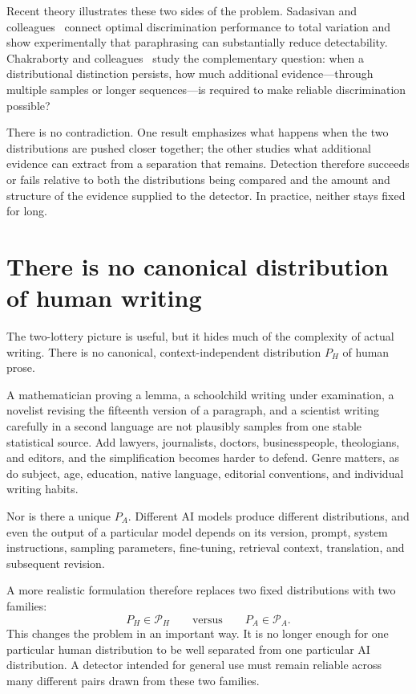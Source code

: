 \documentclass[pdflatex,sn-mathphys-num]{sn-jnl}
\begin{document}
Recent theory illustrates these two sides of the problem. Sadasivan and colleagues~\cite{Sadasivan2025} connect optimal discrimination performance 
to total variation and show experimentally that paraphrasing can substantially reduce detectability. Chakraborty and colleagues~\cite{Chakraborty2024} 
study the complementary question: when a distributional distinction persists, how much additional evidence---through multiple samples or longer 
sequences---is required to make reliable discrimination possible?

There is no contradiction. One result emphasizes what happens when the two distributions are pushed closer together; the other studies what additional 
evidence can extract from a separation that remains. Detection therefore succeeds or fails relative to both the distributions being compared and the amount 
and structure of the evidence supplied to the detector. In practice, neither stays fixed for long.

\section*{There is no canonical distribution of human writing}
The two-lottery picture is useful, but it hides much of the complexity of actual writing. There is no canonical, context-independent distribution \(P_H\)
of human prose.

A mathematician proving a lemma, a schoolchild writing under examination, a novelist revising the fifteenth version of a paragraph, and a scientist 
writing carefully in a second language are not plausibly samples from one stable statistical source. Add lawyers, journalists, doctors, businesspeople, 
theologians, and editors, and the simplification becomes harder to defend. Genre matters, as do subject, age, education, native 
language, editorial conventions, and individual writing habits.

Nor is there a unique \(P_A\). Different AI models produce different distributions, and even the output of a particular model depends on its version, 
prompt, system instructions, sampling parameters, fine-tuning, retrieval context, translation, and subsequent revision.

A more realistic formulation therefore replaces two fixed distributions with two families:
\[
P_H\in\mathcal P_H
\qquad\text{versus}\qquad
P_A\in\mathcal P_A.
\]
This changes the problem in an important way. It is no longer enough for one particular human distribution to be well separated from one particular 
AI distribution. A detector intended for general use must remain reliable across many different pairs drawn from these two families.
\end{document}
